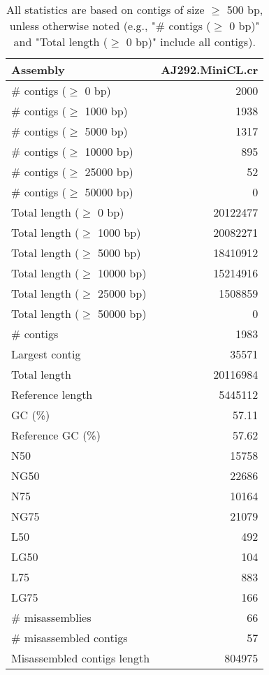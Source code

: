 \documentclass[12pt,a4paper]{article}
\begin{document}
\begin{table}[ht]
\begin{center}
\caption{All statistics are based on contigs of size $\geq$ 500 bp, unless otherwise noted (e.g., "\# contigs ($\geq$ 0 bp)" and "Total length ($\geq$ 0 bp)" include all contigs).}
\begin{tabular}{|l*{1}{|r}|}
\hline
Assembly & AJ292.MiniCL.cr \\ \hline
\# contigs ($\geq$ 0 bp) & 2000 \\ \hline
\# contigs ($\geq$ 1000 bp) & 1938 \\ \hline
\# contigs ($\geq$ 5000 bp) & 1317 \\ \hline
\# contigs ($\geq$ 10000 bp) & 895 \\ \hline
\# contigs ($\geq$ 25000 bp) & 52 \\ \hline
\# contigs ($\geq$ 50000 bp) & 0 \\ \hline
Total length ($\geq$ 0 bp) & 20122477 \\ \hline
Total length ($\geq$ 1000 bp) & 20082271 \\ \hline
Total length ($\geq$ 5000 bp) & 18410912 \\ \hline
Total length ($\geq$ 10000 bp) & 15214916 \\ \hline
Total length ($\geq$ 25000 bp) & 1508859 \\ \hline
Total length ($\geq$ 50000 bp) & 0 \\ \hline
\# contigs & 1983 \\ \hline
Largest contig & 35571 \\ \hline
Total length & 20116984 \\ \hline
Reference length & 5445112 \\ \hline
GC (\%) & 57.11 \\ \hline
Reference GC (\%) & 57.62 \\ \hline
N50 & 15758 \\ \hline
NG50 & 22686 \\ \hline
N75 & 10164 \\ \hline
NG75 & 21079 \\ \hline
L50 & 492 \\ \hline
LG50 & 104 \\ \hline
L75 & 883 \\ \hline
LG75 & 166 \\ \hline
\# misassemblies & 66 \\ \hline
\# misassembled contigs & 57 \\ \hline
Misassembled contigs length & 804975 \\ \hline

\end{tabular}
\end{center}
\end{table}
\end{document}
